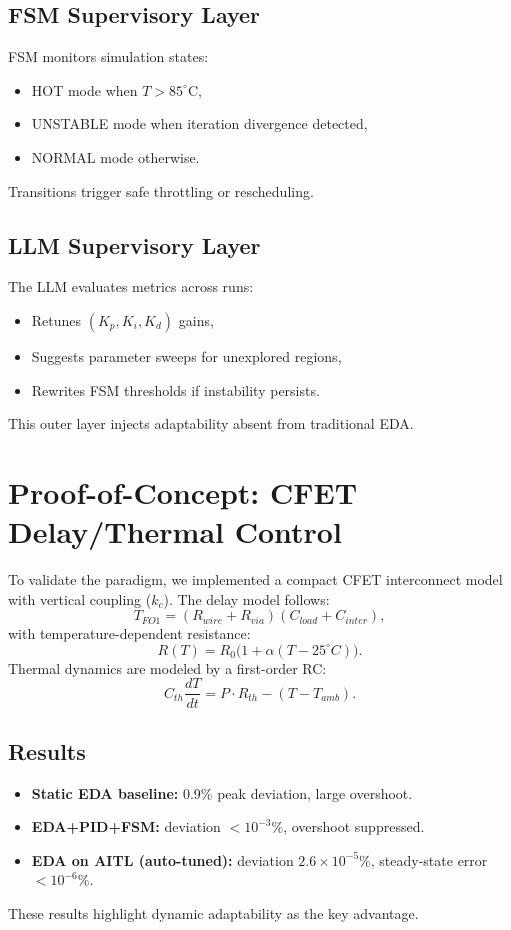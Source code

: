 \documentclass[conference]{IEEEtran}
\begin{document}
\subsection{FSM Supervisory Layer}
FSM monitors simulation states:
\begin{itemize}
  \item HOT mode when $T>85^\circ$C,
  \item UNSTABLE mode when iteration divergence detected,
  \item NORMAL mode otherwise.
\end{itemize}
Transitions trigger safe throttling or rescheduling.

\subsection{LLM Supervisory Layer}
The LLM evaluates metrics across runs:
\begin{itemize}
  \item Retunes $(K_p,K_i,K_d)$ gains,
  \item Suggests parameter sweeps for unexplored regions,
  \item Rewrites FSM thresholds if instability persists.
\end{itemize}
This outer layer injects adaptability absent from traditional EDA.

\section{Proof-of-Concept: CFET Delay/Thermal Control}
To validate the paradigm, we implemented a compact CFET interconnect model 
with vertical coupling ($k_c$). 
The delay model follows:
\begin{equation}
T_{FO1} = (R_{wire}+R_{via})(C_{load}+C_{inter}),
\end{equation}
with temperature-dependent resistance:
\begin{equation}
R(T) = R_0\big(1+\alpha(T-25^\circ C)\big).
\end{equation}
Thermal dynamics are modeled by a first-order RC:
\begin{equation}
C_{th}\frac{dT}{dt} = P\cdot R_{th} - (T-T_{amb}).
\end{equation}

\subsection{Results}
\begin{itemize}
  \item \textbf{Static EDA baseline:} 0.9\% peak deviation, large overshoot.
  \item \textbf{EDA+PID+FSM:} deviation $<10^{-3}\%$, overshoot suppressed.
  \item \textbf{EDA on AITL (auto-tuned):} deviation $2.6\times10^{-5}\%$, 
  steady-state error $<10^{-6}\%$.
\end{itemize}
These results highlight dynamic adaptability as the key advantage.
\end{document}
